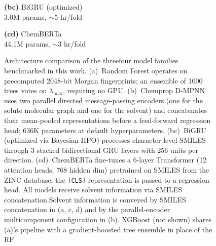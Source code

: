 \documentclass[journal=jcisd8,manuscript=article]{achemso}
\newcommand{\added}[1]{{\color{addedblue}#1}}
\newcommand{\removed}[1]{{\color{removedred}#1}}
\begin{document}
\begin{figure}[htbp]
\begin{minipage}[t]{0.23\textwidth}
\textbf{(\removed{b}\added{c})} BiGRU (optimized)\\[2pt]
{\scriptsize 3.0M params, $\sim$5 hr/fold}
\end{minipage}
\hfill
\begin{minipage}[t]{0.23\textwidth}
\centering
{}

\textbf{(\removed{c}\added{d})} ChemBERTa\\[2pt]
{\scriptsize 44.1M params, $\sim$3 hr/fold}
\end{minipage}

\caption{Architecture comparison of the \removed{three}\added{four} model families \added{benchmarked in this work}. (a)~Random Forest operates on precomputed 2048-bit Morgan fingerprints; an ensemble of 1000 trees votes on $\lambda_{\max}$, requiring no GPU. \added{(b)~Chemprop D-MPNN uses two parallel directed message-passing encoders (one for the solute molecular graph and one for the solvent) and concatenates their mean-pooled representations before a feed-forward regression head; 636K parameters at default hyperparameters.} (\removed{b}\added{c})~BiGRU (optimized via Bayesian HPO) processes character-level SMILES through 3 stacked bidirectional GRU layers with 256 units per direction. (\removed{c}\added{d})~ChemBERTa fine-tunes a 6-layer Transformer (12 attention heads, 768 hidden dim) pretrained on SMILES from the ZINC database; the \texttt{[CLS]} representation is passed to a regression head. \removed{All models receive solvent information via SMILES concatenation.}\added{Solvent information is conveyed by SMILES concatenation in (a, c, d) and by the parallel-encoder multicomponent configuration in (b). XGBoost (not shown) shares (a)'s pipeline with a gradient-boosted tree ensemble in place of the RF.}}
\label{fig:model_overview}
\end{figure}
\end{document}

